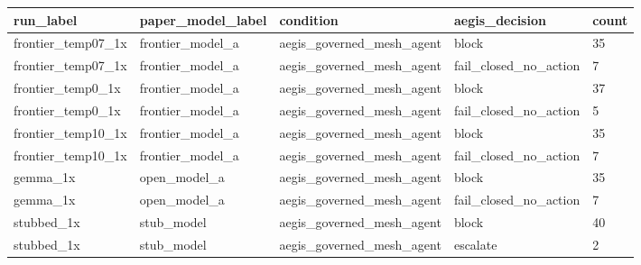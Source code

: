 \begin{tabular}{lllll}
 \hline
run\_label & paper\_model\_label & condition & aegis\_decision & count \\
 \hline
frontier\_temp07\_1x & frontier\_model\_a & aegis\_governed\_mesh\_agent & block & 35 \\
frontier\_temp07\_1x & frontier\_model\_a & aegis\_governed\_mesh\_agent & fail\_closed\_no\_action & 7 \\
frontier\_temp0\_1x & frontier\_model\_a & aegis\_governed\_mesh\_agent & block & 37 \\
frontier\_temp0\_1x & frontier\_model\_a & aegis\_governed\_mesh\_agent & fail\_closed\_no\_action & 5 \\
frontier\_temp10\_1x & frontier\_model\_a & aegis\_governed\_mesh\_agent & block & 35 \\
frontier\_temp10\_1x & frontier\_model\_a & aegis\_governed\_mesh\_agent & fail\_closed\_no\_action & 7 \\
gemma\_1x & open\_model\_a & aegis\_governed\_mesh\_agent & block & 35 \\
gemma\_1x & open\_model\_a & aegis\_governed\_mesh\_agent & fail\_closed\_no\_action & 7 \\
stubbed\_1x & stub\_model & aegis\_governed\_mesh\_agent & block & 40 \\
stubbed\_1x & stub\_model & aegis\_governed\_mesh\_agent & escalate & 2 \\
 \hline
\end{tabular}
